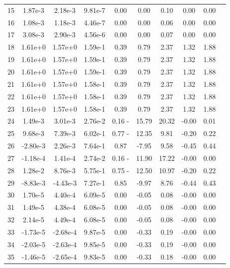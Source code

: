 \documentclass[11pt]{article}
\begin{document}
\begin{table}[H]
{\begin{tabular}{|c|c|c|c|c|c|c|c|c|c|}
15  &  1.87e-3 &  2.18e-3  & 9.81e-7   & 0.00  &  0.00&      0.10&  0.00&   0.00 \\
16  &  1.08e-3 &  1.18e-3  & 4.46e-7   & 0.00  &  0.00&      0.06&  0.00&   0.00 \\
17  &  3.08e-3 &  2.90e-3  & 4.56e-6   & 0.00  &  0.00&      0.07&  0.00&   0.00 \\
18  &  1.61e+0 &  1.57e+0  & 1.59e-1   & 0.39  &  0.79&      2.37&  1.32&   1.88 \\
19  &  1.61e+0 &  1.57e+0  & 1.59e-1   & 0.39  &  0.79&      2.37&  1.32&   1.88 \\
20  &  1.61e+0 &  1.57e+0  & 1.59e-1   & 0.39  &  0.79&      2.37&  1.32&   1.88 \\
21  &  1.61e+0 &  1.57e+0  & 1.58e-1   & 0.39  &  0.79&      2.37&  1.32&   1.88 \\
22  &  1.61e+0 &  1.57e+0  & 1.58e-1   & 0.39  &  0.79&      2.37&  1.32&   1.88 \\
23  &  1.61e+0 &  1.57e+0  & 1.58e-1   & 0.39  &  0.79&      2.37&  1.32&   1.88 \\
24  &  1.49e-3 &  3.01e-3  & 2.76e-2   & 0.16 -& 15.79&     20.32& -0.00&   0.01 \\
25  &  9.68e-3 &  7.39e-3  & 6.02e-1   & 0.77 -& 12.35&      9.81& -0.20&   0.22 \\
26  & -2.80e-3 &  2.26e-3  & 7.64e-1   & 0.87  & -7.95&      9.58& -0.45&   0.44 \\
27  & -1.18e-4 &  1.41e-4  & 2.74e-2   & 0.16 -& 11.90&     17.22& -0.00&   0.00 \\
28  &  1.28e-2 &  8.76e-3  & 5.75e-1   & 0.75 -& 12.50&     10.97& -0.20&   0.22 \\
29  & -8.83e-3 & -4.43e-3  & 7.27e-1   & 0.85  & -9.97&      8.76& -0.44&   0.43 \\
30  &  1.70e-5 &  4.40e-4  & 6.09e-5   & 0.00  & -0.05&      0.08& -0.00&   0.00 \\
31  &  1.49e-5 &  4.38e-4  & 6.08e-5   & 0.00  & -0.05&      0.08& -0.00&   0.00 \\
32  &  2.14e-5 &  4.49e-4  & 6.08e-5   & 0.00  & -0.05&      0.08& -0.00&   0.00 \\
33  & -1.73e-5 & -2.68e-4  & 9.87e-5   & 0.00  & -0.33&      0.19& -0.00&   0.00 \\
34  & -2.03e-5 & -2.63e-4  & 9.85e-5   & 0.00  & -0.33&      0.19& -0.00&   0.00 \\
35  & -1.46e-5 & -2.65e-4  & 9.83e-5   & 0.00  & -0.33&      0.18& -0.00&   0.00 \\

\end{tabular}}
\end{table}
\end{document}
